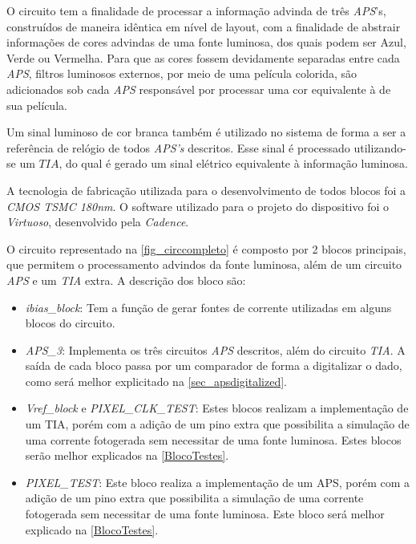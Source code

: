 O circuito tem a finalidade de processar a informação advinda de tr\^es \emph{APS}'s, constru\'idos de maneira id\^entica em n\'ivel de layout, com a finalidade de abstrair informações de cores advindas de uma fonte luminosa, dos quais podem ser Azul, Verde ou Vermelha. Para que as cores fossem devidamente separadas entre cada \emph{APS}, filtros luminosos externos, por meio de uma pel\'icula colorida, são adicionados sob cada \emph{APS} respons\'avel por processar uma cor equivalente \`a de sua pel\'icula.

Um sinal luminoso de cor branca tamb\'em \'e utilizado no sistema de forma a ser a refer\^encia de rel\'ogio de todos \emph{APS's} descritos. Esse sinal \'e processado utilizando-se um $TIA$, do qual \'e gerado um sinal el\'etrico equivalente \`a informação luminosa.

A tecnologia de fabricação utilizada para o desenvolvimento de todos blocos foi a \emph{CMOS TSMC 180nm}. O software utilizado para o projeto do dispositivo foi o \emph{Virtuoso}, desenvolvido pela \emph{Cadence}.

O circuito representado na \autoref{fig_circcompleto} \'e composto por 2 blocos principais, que permitem o processamento advindos da fonte luminosa, al\'em de um circuito \emph{APS} e um \emph{TIA} extra. A descrição dos bloco são:

\begin{itemize}
    \item \emph{ibias\_block}: Tem a função de gerar fontes de corrente utilizadas em alguns blocos do circuito.
    
    \item \emph{APS\_3}: Implementa os tr\^es circuitos \emph{APS} descritos, al\'em do circuito \emph{TIA}. A sa\'ida de cada bloco passa por um comparador de forma a digitalizar o dado, como ser\'a melhor explicitado na \autoref{sec_apsdigitalized}.
    
    \item \emph{Vref\_block} e \emph{PIXEL\_CLK\_TEST}: Estes blocos realizam a implementação de um TIA, por\'em com a adição de um pino extra que possibilita a simulação de uma corrente fotogerada sem necessitar de uma fonte luminosa. Estes blocos serão melhor explicados na \autoref{BlocoTestes}. 
    
    \item \emph{PIXEL\_TEST}: Este bloco realiza a implementação de um APS, por\'em com a adição de um pino extra que possibilita a simulação de uma corrente fotogerada sem necessitar de uma fonte luminosa. Este bloco será melhor explicado na \autoref{BlocoTestes}.
    
\end{itemize}


